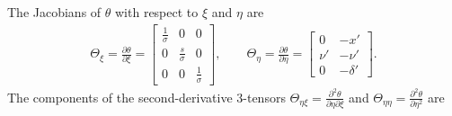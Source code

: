 \documentclass{article}
\begin{document}
The Jacobians of $\theta$ with respect to $\xi$ and $\eta$ are
%
\begin{align}
  \Theta_{\xi} = \frac{\partial \theta}{\partial \xi} =
  \begin{bmatrix}
    \frac{1}{\sigma} & 0                & 0                \\
    0                & \frac{s}{\sigma} & 0                \\
    0                & 0                & \frac{1}{\sigma}
  \end{bmatrix},
  \qquad
  \Theta_{\eta} = \frac{\partial \theta}{\partial \eta} =
  \begin{bmatrix}
    0    & -x'      \\
    \nu' & -\nu'    \\
    0    & -\delta'
  \end{bmatrix}.
\end{align}
%
The components of the second-derivative 3-tensors
$\Theta_{\eta\xi} = \frac{\partial^2 \theta}{\partial \eta \partial \xi}$ and
$\Theta_{\eta\eta} = \frac{\partial^2 \theta}{\partial \eta^2}$
are
%
\end{document}
